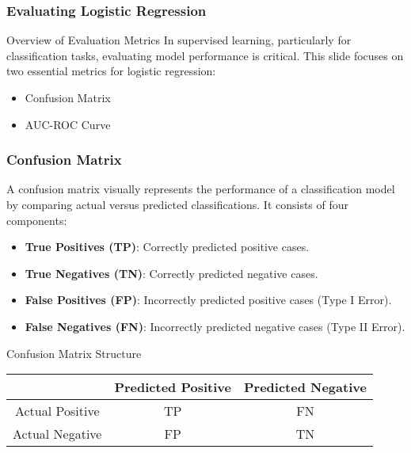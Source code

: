 \documentclass[aspectratio=169]{beamer}
\begin{document}
\begin{frame}
    \frametitle{Evaluating Logistic Regression}
    \begin{block}{Overview of Evaluation Metrics}
        In supervised learning, particularly for classification tasks, evaluating model performance is critical. This slide focuses on two essential metrics for logistic regression: 
        \begin{itemize}
            \item Confusion Matrix
            \item AUC-ROC Curve
        \end{itemize}
    \end{block}
\end{frame}

\begin{frame}
    \frametitle{Confusion Matrix}
    A confusion matrix visually represents the performance of a classification model by comparing actual versus predicted classifications. It consists of four components:
    \begin{itemize}
        \item \textbf{True Positives (TP)}: Correctly predicted positive cases.
        \item \textbf{True Negatives (TN)}: Correctly predicted negative cases.
        \item \textbf{False Positives (FP)}: Incorrectly predicted positive cases (Type I Error).
        \item \textbf{False Negatives (FN)}: Incorrectly predicted negative cases (Type II Error).
    \end{itemize}

    \begin{block}{Confusion Matrix Structure}
    \begin{tabular}{|c|c|c|}
    \hline
                & Predicted Positive & Predicted Negative \\
    \hline
    Actual Positive & TP                  & FN                 \\
    \hline
    Actual Negative & FP                  & TN                 \\
    \hline
    \end{tabular}
    \end{block}
\end{frame}
\end{document}
